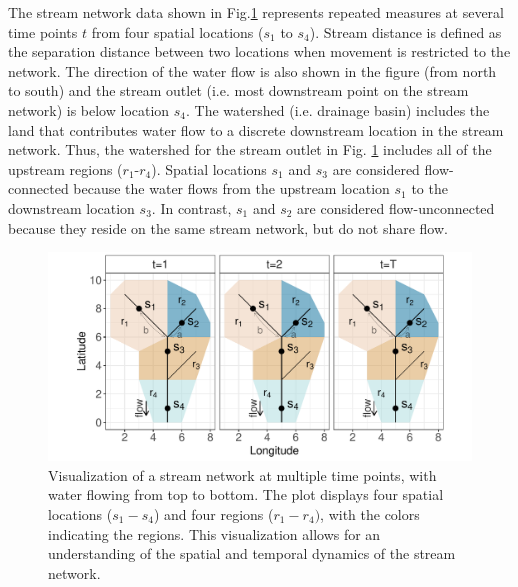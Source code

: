 The stream network data shown in Fig.\ref{fig:network} represents repeated measures at several time points $t$ from four spatial locations ($s_1$ to $s_4$). Stream distance is defined as the separation distance between two locations when movement is restricted to the network. The direction of the water flow is also shown in the figure (from north to south) and the stream outlet (i.e. most downstream point on the stream network) is below location $s_4$. The watershed (i.e. drainage basin) includes the land that contributes water flow to a discrete downstream location in the stream network. Thus, the watershed for the stream outlet in Fig. \ref{fig:network} includes all of the upstream regions ($r_1$-$r_4$). Spatial locations $s_1$ and $s_3$ are considered flow-connected because the water flows from the upstream location $s_1$ to the downstream location $s_3$. In contrast, $s_1$ and $s_2$ are considered flow-unconnected because they reside on the same stream network, but do not share flow. 

\begin{figure}[htbp]
  \centering
   \includegraphics[width=5.25in]{./Figs_Pay/netw.pdf}
  \caption{
 Visualization of a stream network at multiple time points, with water flowing from top to bottom. The plot displays four spatial locations ($s_1-s_4$) and four regions ($r_1-r_4)$, with the colors indicating the regions. This visualization allows for an understanding of the spatial and temporal dynamics of the stream network.  
  }
  \label{fig:network}
\end{figure}

